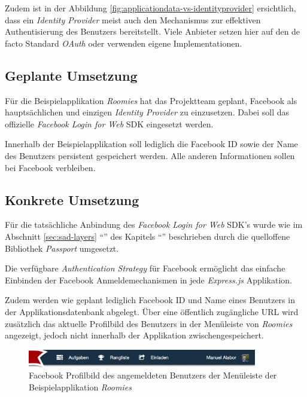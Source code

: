 Zudem ist in der Abbildung \ref{fig:applicationdata-vs-identityprovider} ersichtlich, dass ein \emph{Identity Provider} meist auch den Mechanismus zur effektiven Authentisierung des Benutzers bereitstellt. Viele Anbieter setzen hier auf den de facto Standard \emph{OAuth} \cite{oauth} oder verwenden eigene Implementationen.


\subsection*{Geplante Umsetzung}

Für die Beispielapplikation \emph{Roomies} hat das Projektteam geplant, Facebook als hauptsächlichen und einzigen \emph{Identity Provider} zu einzusetzen. Dabei soll das offizielle \emph{Facebook Login for Web} \cite{facebooklogin} \gls{SDK} eingesetzt werden.

Innerhalb der Beispielapplikation soll lediglich die Facebook ID sowie der Name des Benutzers persistent gespeichert werden. Alle anderen Informationen sollen bei Facebook verbleiben.


\subsection*{Konkrete Umsetzung}

Für die tatsächliche Anbindung des \emph{Facebook Login for Web} \cite{facebooklogin} \gls{SDK}'s wurde wie im Abschnitt \ref{sec:sad-layers} ``'' des Kapitels ``'' beschrieben durch die quelloffene Bibliothek \emph{Passport} \cite{Passportjs} umgesetzt.

Die verfügbare \emph{Authentication Strategy} für Facebook \cite{passport-facebook} ermöglicht das einfache Einbinden der Facebook Anmeldemechanismen in jede \emph{Express.js} Applikation.

Zudem werden wie geplant lediglich Facebook ID und Name eines Benutzers in der Applikationsdatenbank abgelegt. Über eine öffentlich zugängliche \gls{URL} \cite{facebook-profilepicture} wird zusätzlich das aktuelle Profilbild des Benutzers in der Menüleiste von \emph{Roomies} angezeigt, jedoch nicht innerhalb der Applikation zwischengespeichert.

\begin{figure}[H]
	\centering
	\includegraphics[width=10cm]{content/principle-demonstration/images/roomies-navigation-loggedin.png}
	\caption{Facebook Profilbild des angemeldeten Benutzers der Menüleiste der Beispielapplikation \emph{Roomies}}
	\label{fig:facebook-profilepicture-roomies}
\end{figure}


